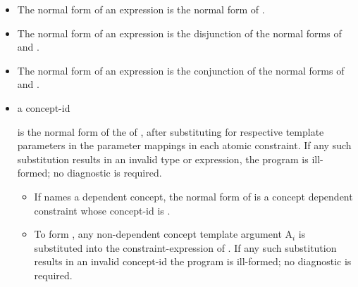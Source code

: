 \documentclass{wg21}
\begin{document}
%
\begin{itemize}
\item
The normal form of an expression  is
the normal form of .

\item
The normal form of an expression  is
the disjunction  of
the normal forms of  and .

\item
The normal form of an expression 
is the conjunction of
the normal forms of  and .


\item

 a concept-id  
\begin{removedblock}
is the normal form of the  of ,
after substituting  for
 respective template parameters in the
parameter mappings in each atomic constraint.
If any such substitution results in an invalid type or expression,
the program is ill-formed; no diagnostic is required.
\end{removedblock}
\begin{addedblock}
\begin{itemize}
\item If  names a dependent concept,  the normal form of  is a concept dependent constraint whose concept-id is .

\item To form , any non-dependent concept template argument A$_i$
is substituted into the constraint-expression of .
If any such substitution results in an invalid concept-id the program is ill-formed; no diagnostic is required.


\end{itemize}
\end{addedblock}
\end{itemize}
\end{document}
